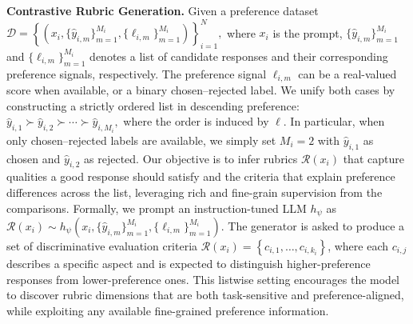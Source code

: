 \noindent \textbf{Contrastive Rubric Generation.} 
Given a preference dataset
$
\mathcal{D}=\left\{\left(x_i, \{\hat{y}_{i,m}\}_{m=1}^{M_i}, \{\ell_{i,m}\}_{m=1}^{M_i}\right)\right\}_{i=1}^N,
$
where $x_i$ is the prompt, $\{\hat{y}_{i,m}\}_{m=1}^{M_i}$ and $\{\ell_{i,m}\}_{m=1}^{M_i}$ denotes a list of candidate responses and their corresponding preference signals, respectively.
The preference signal $\ell_{i,m}$ can be a real-valued score when available, or a binary chosen--rejected label.
We unify both cases by constructing a strictly ordered list in descending preference:
$
\hat{y}_{i,1}\succ \hat{y}_{i,2}\succ \cdots \succ \hat{y}_{i,M_i},
$
where the order is induced by $\ell$.
In particular, when only chosen--rejected labels are available, we simply set $M_i=2$ with $\hat{y}_{i,1}$ as chosen and $\hat{y}_{i,2}$ as rejected.
Our objective is to infer rubrics $\mathcal{R}(x_i)$ that capture qualities a good response should satisfy and the criteria that explain preference differences across the list, leveraging rich and fine-grain supervision from the comparisons.
Formally, we prompt an instruction-tuned LLM $h_\psi$ as
$
\mathcal{R}(x_i) \sim h_\psi\!\left(x_i, \{\hat{y}_{i,m}\}_{m=1}^{M_i}, \{\ell_{i,m}\}_{m=1}^{M_i}\right).
$
The generator is asked to produce a set of discriminative evaluation criteria
$\mathcal{R}(x_i)=\left\{c_{i,1}, \ldots, c_{i,k_i}\right\}$,
where each $c_{i,j}$ describes a specific aspect and is expected to distinguish higher-preference responses from lower-preference ones.
This listwise setting encourages the model to discover rubric dimensions that are both task-sensitive and preference-aligned, while exploiting any available fine-grained preference information.



